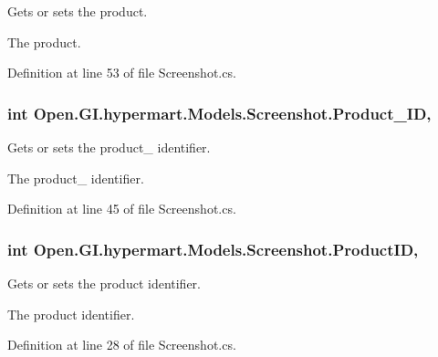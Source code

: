 Gets or sets the product. 

The product. 

Definition at line 53 of file Screenshot.\+cs.

\hypertarget{class_open_1_1_g_i_1_1hypermart_1_1_models_1_1_screenshot_ad4a216c738b5d98ddc006359ebdfe304}{}
\subsubsection[{Product\+\_\+\+I\+D}]{\setlength{\rightskip}{0pt plus 5cm}int Open.\+G\+I.\+hypermart.\+Models.\+Screenshot.\+Product\+\_\+\+I\+D\hspace{0.3cm}{\ttfamily [get]}, {\ttfamily [set]}}\label{class_open_1_1_g_i_1_1hypermart_1_1_models_1_1_screenshot_ad4a216c738b5d98ddc006359ebdfe304}


Gets or sets the product\+\_\+ identifier. 

The product\+\_\+ identifier. 

Definition at line 45 of file Screenshot.\+cs.

\hypertarget{class_open_1_1_g_i_1_1hypermart_1_1_models_1_1_screenshot_ad381abf51bb0ebb1c2566c70df11c05a}{}
\subsubsection[{Product\+I\+D}]{\setlength{\rightskip}{0pt plus 5cm}int Open.\+G\+I.\+hypermart.\+Models.\+Screenshot.\+Product\+I\+D\hspace{0.3cm}{\ttfamily [get]}, {\ttfamily [set]}}\label{class_open_1_1_g_i_1_1hypermart_1_1_models_1_1_screenshot_ad381abf51bb0ebb1c2566c70df11c05a}


Gets or sets the product identifier. 

The product identifier. 

Definition at line 28 of file Screenshot.\+cs.

\hypertarget{class_open_1_1_g_i_1_1hypermart_1_1_models_1_1_screenshot_a435ca1863d66de2de497d603585610d8}{}
